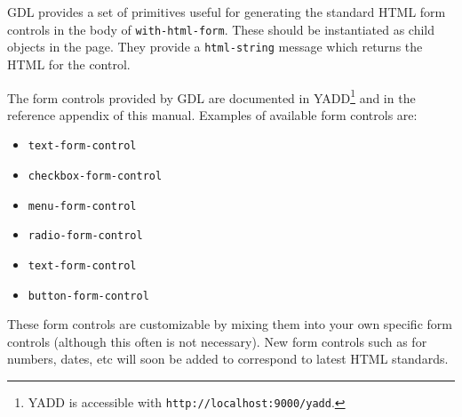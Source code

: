 \documentclass [11pt]{book}
\begin{document}
GDL provides a set of primitives useful for generating the
standard HTML form controls in the body of \texttt{with-html-form}.
These should be instantiated as child objects in the page.  They provide a
\texttt{html-string} message which returns the HTML for the control.



The form controls provided by GDL are documented in YADD\footnote{YADD
is accessible with \texttt{http://localhost:9000/yadd}.} and in the reference appendix
of this manual. Examples of available form controls are:

\begin{itemize}

\item \texttt{text-form-control}

\item \texttt{checkbox-form-control}

\item \texttt{menu-form-control}

\item \texttt{radio-form-control}

\item \texttt{text-form-control}

\item \texttt{button-form-control}

\end{itemize}





These form controls are customizable by mixing them into
	   your own specific form controls (although this often is not
	   necessary). New form controls such as for numbers, dates,
	   etc will soon be added to correspond to latest HTML
	   standards.
\end{document}
